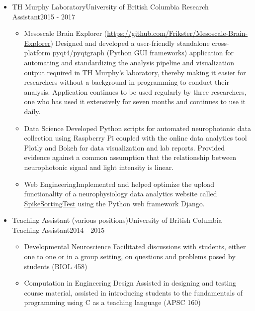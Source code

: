 \documentclass[11pt,a4paper,sans]{moderncv}        %
\begin{document}
\begin{itemize}
    \item{}
    
    
      {TH Murphy Laboratory}{University of British Columbia}
      {Research Assistant}{2015 - 2017}
      
      
      \begin{itemize}
        \item{Mesoscale Brain Explorer (\href{https://github.com/Frikster/Mesoscale-Brain-Explorer}{https://github.com/Frikster/Mesoscale-Brain-Explorer})}
          {Designed and developed a user-friendly standalone cross-platform pyqt4/pyqtgraph (Python GUI frameworks) application for automating and standardizing the analysis pipeline and visualization output required in TH Murphy's laboratory, thereby making it easier for researchers without a background in programming to conduct their analysis. Application continues to be used regularly by three researchers, one who has used it extensively for seven months and continues to use it daily.
          }
          \item{Data Science}
          {Developed Python scripts for automated neurophotonic data collection using Raspberry Pi coupled with the online data analytics tool Plotly and Bokeh for data visualization and lab reports. Provided evidence against a common assumption that the relationship between neurophotonic signal and light intensity is linear.
          }
          \item{Web Engineering}{Implemented and helped optimize the upload functionality of a neurophysiology data analytics website called \href{SpikeSortingTest.com}{SpikeSortingTest} using the Python web framework Django.}
      \end{itemize}

    \item{}
    
    {Teaching Assistant (various positions)}{University of British Columbia}
      {Teaching Assistant}{2014 - 2015}
      
      
      \begin{itemize}
        \item{Developmental Neuroscience}
          {Facilitated discussions with students, either one to one or in a group setting, on questions and problems posed by students (BIOL 458)}
        \item{Computation in Engineering Design}
          {Assisted in designing and testing course material, assisted in introducing students to the fundamentals of programming using C as a teaching language (APSC 160)}
      \end{itemize}


\end{itemize}
\end{document}

